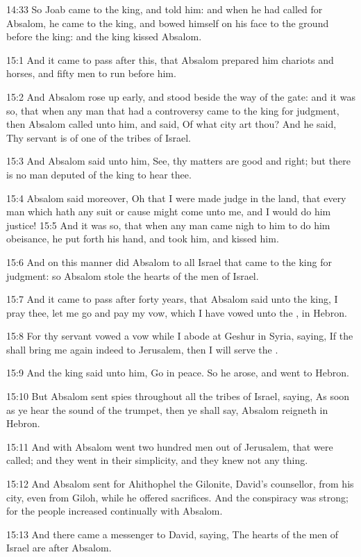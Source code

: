 14:33 So Joab came to the king, and told him: and when he had called for Absalom, he came to the king, and bowed himself on his face to the ground before the king: and the king kissed Absalom.

15:1 And it came to pass after this, that Absalom prepared him chariots and horses, and fifty men to run before him.

15:2 And Absalom rose up early, and stood beside the way of the gate: and it was so, that when any man that had a controversy came to the king for judgment, then Absalom called unto him, and said, Of what city art thou? And he said, Thy servant is of one of the tribes of Israel.

15:3 And Absalom said unto him, See, thy matters are good and right; but there is no man deputed of the king to hear thee.

15:4 Absalom said moreover, Oh that I were made judge in the land, that every man which hath any suit or cause might come unto me, and I would do him justice!  15:5 And it was so, that when any man came nigh to him to do him obeisance, he put forth his hand, and took him, and kissed him.

15:6 And on this manner did Absalom to all Israel that came to the king for judgment: so Absalom stole the hearts of the men of Israel.

15:7 And it came to pass after forty years, that Absalom said unto the king, I pray thee, let me go and pay my vow, which I have vowed unto the \LORD, in Hebron.

15:8 For thy servant vowed a vow while I abode at Geshur in Syria, saying, If the \LORD shall bring me again indeed to Jerusalem, then I will serve the \LORD.

15:9 And the king said unto him, Go in peace. So he arose, and went to Hebron.

15:10 But Absalom sent spies throughout all the tribes of Israel, saying, As soon as ye hear the sound of the trumpet, then ye shall say, Absalom reigneth in Hebron.

15:11 And with Absalom went two hundred men out of Jerusalem, that were called; and they went in their simplicity, and they knew not any thing.

15:12 And Absalom sent for Ahithophel the Gilonite, David's counsellor, from his city, even from Giloh, while he offered sacrifices. And the conspiracy was strong; for the people increased continually with Absalom.

15:13 And there came a messenger to David, saying, The hearts of the men of Israel are after Absalom.

